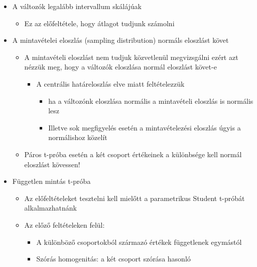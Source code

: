 \documentclass[
  letterpaper,
  DIV=11,
  numbers=noendperiod]{scrreprt}
\providecommand{\tightlist}{%
  \setlength{\itemsep}{0pt}\setlength{\parskip}{0pt}}\usepackage{longtable,booktabs,array}
\begin{document}
\begin{itemize}
\item
  A változók legalább intervallum skálájúak

  \begin{itemize}
  \tightlist
  \item
    Ez az előfeltétele, hogy átlagot tudjunk számolni
  \end{itemize}
\item
  A mintavételei eloszlás (sampling distribution) normáls eloszlást
  követ

  \begin{itemize}
  \item
    A mintavételi eloszlást nem tudjuk közvetlenül megvizsgálni ezért
    azt nézzük meg, hogy a változók eloszlása normál eloszlást követ-e

    \begin{itemize}
    \item
      A centrális határeloszlás elve miatt feltételezzük

      \begin{itemize}
      \item
        ha a változónk eloszlása normális a mintavételi eloszlás is
        normális lesz
      \item
        Illetve sok megfigyelés esetén a mintavételezési eloszlás úgyis
        a normálishoz közelít
      \end{itemize}
    \end{itemize}
  \item
    Páros t-próba esetén a két csoport értékeinek a különbsége kell
    normál eloszlást kövessen!
  \end{itemize}
\item
  Független mintás t-próba

  \begin{itemize}
  \item
    Az előfeltételeket tesztelni kell mielőtt a parametrikus Student
    t-próbát alkalmazhatnánk
  \item
    Az előző feltételeken felül:

    \begin{itemize}
    \item
      A különböző csoportokból származó értékek függetlenek egymástól
    \item
      Szórás homogenitás: a két csoport szórása hasonló
    \end{itemize}
  \end{itemize}
\end{itemize}
\end{document}
